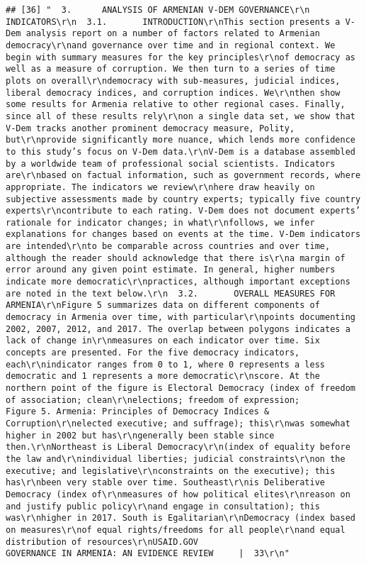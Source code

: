 \documentclass[
]{article}
\begin{document}
\begin{verbatim}
## [36] "  3.      ANALYSIS OF ARMENIAN V-DEM GOVERNANCE\r\n          INDICATORS\r\n  3.1.       INTRODUCTION\r\nThis section presents a V-Dem analysis report on a number of factors related to Armenian democracy\r\nand governance over time and in regional context. We begin with summary measures for the key principles\r\nof democracy as well as a measure of corruption. We then turn to a series of time plots on overall\r\ndemocracy with sub-measures, judicial indices, liberal democracy indices, and corruption indices. We\r\nthen show some results for Armenia relative to other regional cases. Finally, since all of these results rely\r\non a single data set, we show that V-Dem tracks another prominent democracy measure, Polity, but\r\nprovide significantly more nuance, which lends more confidence to this study’s focus on V-Dem data.\r\nV-Dem is a database assembled by a worldwide team of professional social scientists. Indicators are\r\nbased on factual information, such as government records, where appropriate. The indicators we review\r\nhere draw heavily on subjective assessments made by country experts; typically five country experts\r\ncontribute to each rating. V-Dem does not document experts’ rationale for indicator changes; in what\r\nfollows, we infer explanations for changes based on events at the time. V-Dem indicators are intended\r\nto be comparable across countries and over time, although the reader should acknowledge that there is\r\na margin of error around any given point estimate. In general, higher numbers indicate more democratic\r\npractices, although important exceptions are noted in the text below.\r\n  3.2.       OVERALL MEASURES FOR ARMENIA\r\nFigure 5 summarizes data on different components of democracy in Armenia over time, with particular\r\npoints documenting 2002, 2007, 2012, and 2017. The overlap between polygons indicates a lack of change in\r\nmeasures on each indicator over time. Six concepts are presented. For the five democracy indicators, each\r\nindicator ranges from 0 to 1, where 0 represents a less democratic and 1 represents a more democratic\r\nscore. At the northern point of the figure is Electoral Democracy (index of freedom of association; clean\r\nelections; freedom of expression;          Figure 5. Armenia: Principles of Democracy Indices & Corruption\r\nelected executive; and suffrage); this\r\nwas somewhat higher in 2002 but has\r\ngenerally been stable since then.\r\nNortheast is Liberal Democracy\r\n(index of equality before the law and\r\nindividual liberties; judicial constraints\r\non the executive; and legislative\r\nconstraints on the executive); this has\r\nbeen very stable over time. Southeast\r\nis Deliberative Democracy (index of\r\nmeasures of how political elites\r\nreason on and justify public policy\r\nand engage in consultation); this was\r\nhigher in 2017. South is Egalitarian\r\nDemocracy (index based on measures\r\nof equal rights/freedoms for all people\r\nand equal distribution of resources\r\nUSAID.GOV                                                 GOVERNANCE IN ARMENIA: AN EVIDENCE REVIEW     |  33\r\n"                                                                                                                                                                                                
\end{verbatim}
\end{document}
